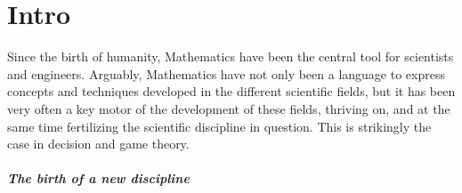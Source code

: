 \ifx \globalmark \undefined %
	
\else

\fi



\chapter*{Intro}
Since the birth of humanity, Mathematics have been the central tool for scientists and engineers.  Arguably, Mathematics have not only been a language to express concepts and techniques developed in the different scientific fields, but it has been very often a key motor of the development of these fields, thriving on, and at the same time fertilizing the scientific discipline in question.  This is strikingly the case in decision and game theory.

\paragraph{The birth of a new discipline}

